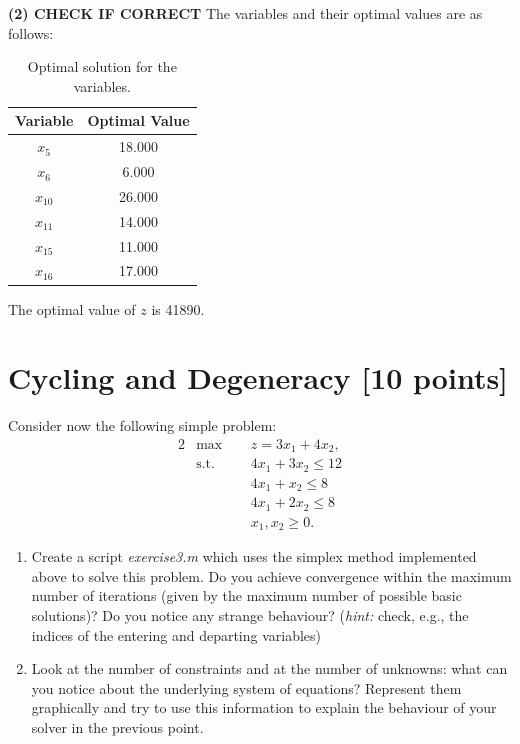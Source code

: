 \documentclass[unicode,11pt,a4paper,oneside,numbers=endperiod,openany]{scrartcl}
\begin{document}
\textbf{(2) CHECK IF CORRECT}
The variables and their optimal values are as follows:

\begin{table}[H]
	\centering
	\begin{tabular}{cc}
		\toprule
		Variable     & Optimal Value \\
		\midrule
		\( x_5 \)    & 18.000        \\
		\( x_6 \)    & 6.000         \\
		\( x_{10} \) & 26.000        \\
		\( x_{11} \) & 14.000        \\
		\( x_{15} \) & 11.000        \\
		\( x_{16} \) & 17.000        \\
		\bottomrule
	\end{tabular}
	\caption{Optimal solution for the variables.}
\end{table}

The optimal value of \( z \) is 41890.

\section{Cycling and Degeneracy [10 points]}

Consider now the following simple problem:
\begin{alignat*}{2}
	 & \text{max}\;\, &  & z = 3x_1+4x_2,   \\
	 & \text{s.t.}    &  & 4x_1+3x_2\leq 12 \\
	 &                &  & 4x_1+x_2\leq 8   \\
	 &                &  & 4x_1+2x_2\leq 8  \\
	 &                &  & x_1, x_2 \geq 0.
\end{alignat*}

\begin{enumerate}
	\item Create a script \emph{exercise3.m} which uses the simplex method implemented above to solve this problem. Do you achieve convergence within the maximum number of iterations (given by the maximum number of possible basic solutions)? Do you notice any strange behaviour? (\emph{hint:} check, e.g., the indices of the entering and departing variables)
	\item Look at the number of constraints and at the number of unknowns: what can you notice about the underlying system of equations? Represent them graphically and try to use this information to explain the behaviour of your solver in the previous point.
\end{enumerate}
\end{document}
